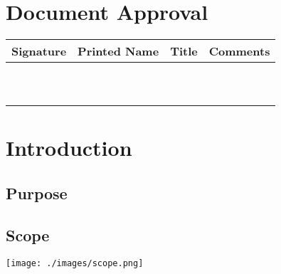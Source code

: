 \documentclass[11pt]{article}
\begin{document}
\section{Document Approval}
\begin{table}[h]
\begin{tabular}{llll}
\textbf{Signature}     & \textbf{Printed Name} & \textbf{Title}        & \textbf{Comments}     \\ \hline
\multicolumn{1}{|l|}{} & \multicolumn{1}{L{4.5cm}|}{} & \multicolumn{1}{L{4cm}|}{} & \multicolumn{1}{L{4cm}|}{} \\ \hline
\multicolumn{1}{|l|}{} & \multicolumn{1}{l|}{} & \multicolumn{1}{l|}{} & \multicolumn{1}{l|}{} \\ \hline
\multicolumn{1}{|l|}{} & \multicolumn{1}{l|}{} & \multicolumn{1}{l|}{} & \multicolumn{1}{l|}{} \\ \hline
\multicolumn{1}{|l|}{} & \multicolumn{1}{l|}{} & \multicolumn{1}{l|}{} & \multicolumn{1}{l|}{} \\ \hline
\multicolumn{1}{|l|}{} & \multicolumn{1}{l|}{} & \multicolumn{1}{l|}{} & \multicolumn{1}{l|}{} \\ \hline
\multicolumn{1}{|l|}{} & \multicolumn{1}{l|}{} & \multicolumn{1}{l|}{} & \multicolumn{1}{l|}{} \\ \hline
\multicolumn{1}{|l|}{} & \multicolumn{1}{l|}{} & \multicolumn{1}{l|}{} & \multicolumn{1}{l|}{} \\ \hline
\multicolumn{1}{|l|}{} & \multicolumn{1}{l|}{} & \multicolumn{1}{l|}{} & \multicolumn{1}{l|}{} \\ \hline
\multicolumn{1}{|l|}{} & \multicolumn{1}{l|}{} & \multicolumn{1}{l|}{} & \multicolumn{1}{l|}{} \\ \hline
\multicolumn{1}{|l|}{} & \multicolumn{1}{l|}{} & \multicolumn{1}{l|}{} & \multicolumn{1}{l|}{} \\ \hline
\end{tabular}
\end{table}

\newpage
\section{Introduction}
\subsection{Purpose}
\subsection{Scope}
\texttt{[image: ./images/scope.png]}
\end{document}
